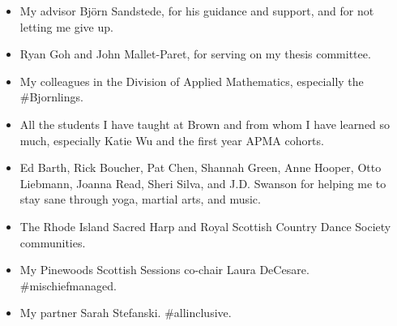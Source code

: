 \begin{itemize}
\item My advisor Bj\"{o}rn Sandstede, for his guidance and support, and for not letting me give up.
\item Ryan Goh and John Mallet-Paret, for serving on my thesis committee.
\item My colleagues in the Division of Applied Mathematics, especially the \#Bjornlings.
\item All the students I have taught at Brown and from whom I have learned so much, especially Katie Wu and the first year APMA cohorts.
\item Ed Barth, Rick Boucher, Pat Chen, Shannah Green, Anne Hooper, Otto Liebmann, Joanna Read, Sheri Silva, and J.D. Swanson for helping me to stay sane through yoga, martial arts, and music.
\item The Rhode Island Sacred Harp and Royal Scottish Country Dance Society communities.
\item My Pinewoods Scottish Sessions co-chair Laura DeCesare. \#mischiefmanaged.
\item My partner Sarah Stefanski. \#allinclusive.
\end{itemize}
